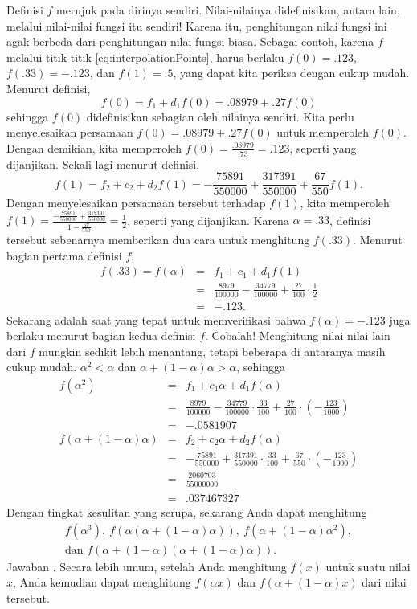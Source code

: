 \noindent Definisi $f$ merujuk pada dirinya sendiri. Nilai-nilainya
didefinisikan, antara lain, melalui nilai-nilai fungsi itu sendiri!
Karena itu, penghitungan nilai fungsi ini agak berbeda dari penghitungan
nilai fungsi biasa. Sebagai contoh, karena $f$ melalui titik-titik
\ref{eq:interpolationPoints}, harus berlaku $f(0)=.123$, $f(.33)=-.123$,
dan $f(1)=.5$, yang dapat kita periksa dengan cukup mudah. Menurut
definisi,
\[
f(0)=f_{1}+d_{1}f(0)=.08979+.27f(0)
\]
 sehingga $f(0)$ didefinisikan sebagian oleh nilainya sendiri. Kita
perlu menyelesaikan persamaan $f(0)=.08979+.27f(0)$ untuk memperoleh
$f(0)$. Dengan demikian, kita memperoleh $f(0)=\frac{.08979}{.73}=.123$,
seperti yang dijanjikan. Sekali lagi menurut definisi, 
\[
f(1)=f_{2}+c_{2}+d_{2}f(1)=-\frac{75891}{550000}+\frac{317391}{550000}+\frac{67}{550}f(1).
\]
Dengan menyelesaikan persamaan tersebut terhadap $f(1)$, kita memperoleh
$f(1)=\frac{-\frac{75891}{550000}+\frac{317391}{550000}}{1-\frac{67}{550}}=\frac{1}{2}$,
seperti yang dijanjikan. Karena $\alpha=.33$, definisi tersebut sebenarnya
memberikan dua cara untuk menghitung $f(.33)$. Menurut bagian pertama
definisi $f$,
\begin{eqnarray*}
f(.33)=f(\alpha) & = & f_{1}+c_{1}+d_{1}f(1)\\
 & = & \frac{8979}{100000}-\frac{34779}{100000}+\frac{27}{100}\cdot\frac{1}{2}\\
 & = & -.123.
\end{eqnarray*}
Sekarang adalah saat yang tepat untuk memverifikasi bahwa $f(\alpha)=-.123$
juga berlaku menurut bagian kedua definisi $f$. Cobalah! Menghitung
nilai-nilai lain dari $f$ mungkin sedikit lebih menantang, tetapi
beberapa di antaranya masih cukup mudah. $\alpha^{2}<\alpha$ dan
$\alpha+(1-\alpha)\alpha>\alpha$, sehingga
\begin{eqnarray*}
f(\alpha^{2}) & = & f_{1}+c_{1}\alpha+d_{1}f\left(\alpha\right)\\
 & = & \frac{8979}{100000}-\frac{34779}{100000}\cdot\frac{33}{100}+\frac{27}{100}\cdot\left(-\frac{123}{1000}\right)\\
 & = & -.0581907\\
f(\alpha+(1-\alpha)\alpha) & = & f_{2}+c_{2}\alpha+d_{2}f\left(\alpha\right)\\
 & = & -\frac{75891}{550000}+\frac{317391}{550000}\cdot\frac{33}{100}+\frac{67}{550}\cdot\left(-\frac{123}{1000}\right)\\
 & = & \frac{2060703}{55000000}\\
 & = & .0374673\overline{27}
\end{eqnarray*}
Dengan tingkat kesulitan yang serupa, sekarang Anda dapat menghitung
\[
\begin{gathered}f(\alpha^{3}),\ f(\alpha(\alpha+(1-\alpha)\alpha)),\ f(\alpha+(1-\alpha)\alpha^{2}),\\
\mbox{dan }f(\alpha+(1-\alpha)(\alpha+(1-\alpha)\alpha)).
\end{gathered}
\]
Jawaban . Secara lebih umum, setelah Anda
menghitung $f(x)$ untuk suatu nilai $x$, Anda kemudian dapat menghitung
$f(\alpha x)$ dan $f(\alpha+(1-\alpha)x)$ dari nilai tersebut.


